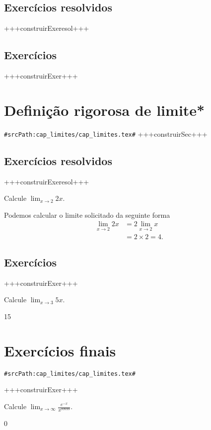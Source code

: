 \subsection*{Exercícios resolvidos}

+++construirExeresol+++


\subsection*{Exercícios}

+++construirExer+++


\section{Definição rigorosa de limite*}
\verb+#srcPath:cap_limites/cap_limites.tex#+
\label{sec:limites_def_rigor}
+++construirSec+++

\subsection*{Exercícios resolvidos}

+++construirExeresol+++

\begin{exeresol}
  Calcule $\lim_{x\to 2} 2x$.
\end{exeresol}
\begin{resol}
  Podemos calcular o limite solicitado da seguinte forma
  \begin{equation}
    \begin{split}
      \lim_{x\to 2} 2x &= 2\lim_{x\to 2} x\\
      &= 2\times 2 = 4.
    \end{split}
  \end{equation}
\end{resol}

\subsection*{Exercícios}

+++construirExer+++

\begin{exer}
  Calcule $\lim_{x\to 3} 5x$.
\end{exer}
\begin{resp}
  15
\end{resp}

\section{Exercícios finais}
\verb+#srcPath:cap_limites/cap_limites.tex#+


+++construirExer+++

\begin{exer}
  Calcule $\displaystyle\lim_{x\to \infty} \frac{e^{-x}}{x^{99999}}$.
\end{exer}
\begin{resp}
  0
\end{resp}

